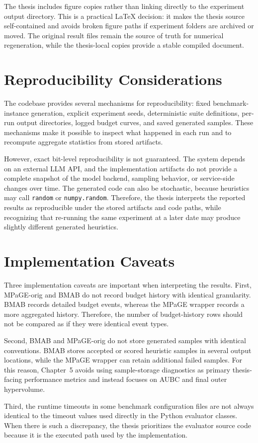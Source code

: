 The thesis includes figure copies rather than linking directly to the experiment output directory. This is a practical LaTeX decision: it makes the thesis source self-contained and avoids broken figure paths if experiment folders are archived or moved. The original result files remain the source of truth for numerical regeneration, while the thesis-local copies provide a stable compiled document.

\section{Reproducibility Considerations}

The codebase provides several mechanisms for reproducibility: fixed benchmark-instance generation, explicit experiment seeds, deterministic suite definitions, per-run output directories, logged budget curves, and saved generated samples. These mechanisms make it possible to inspect what happened in each run and to recompute aggregate statistics from stored artifacts.

However, exact bit-level reproducibility is not guaranteed. The system depends on an external LLM API, and the implementation artifacts do not provide a complete snapshot of the model backend, sampling behavior, or service-side changes over time. The generated code can also be stochastic, because heuristics may call \texttt{random} or \texttt{numpy.random}. Therefore, the thesis interprets the reported results as reproducible under the stored artifacts and code paths, while recognizing that re-running the same experiment at a later date may produce slightly different generated heuristics.

\section{Implementation Caveats}

Three implementation caveats are important when interpreting the results. First, MPaGE-orig and BMAB do not record budget history with identical granularity. BMAB records detailed budget events, whereas the MPaGE wrapper records a more aggregated history. Therefore, the number of budget-history rows should not be compared as if they were identical event types.

Second, BMAB and MPaGE-orig do not store generated samples with identical conventions. BMAB stores accepted or scored heuristic samples in several output locations, while the MPaGE wrapper can retain additional failed samples. For this reason, Chapter~5 avoids using sample-storage diagnostics as primary thesis-facing performance metrics and instead focuses on AUBC and final outer hypervolume.

Third, the runtime timeouts in some benchmark configuration files are not always identical to the timeout values used directly in the Python evaluator classes. When there is such a discrepancy, the thesis prioritizes the evaluator source code because it is the executed path used by the implementation.
